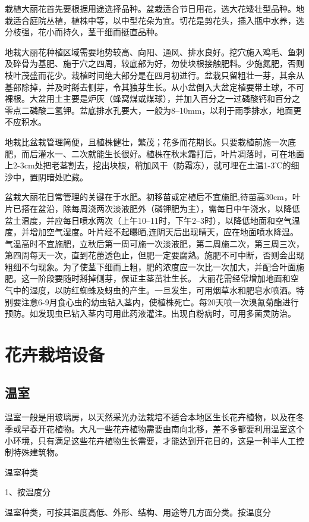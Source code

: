 \documentclass{ctexbook}
\begin{document}
栽植大丽花首先要根据用途选择品种。盆栽适合节日用花，选大花矮壮型品种。地栽适合庭院丛植，植株中等，以中型花朵为宜。切花是剪花头，插入瓶中水养，选分枝强，花小而持久，茎干细而挺直品种。
	
地栽大丽花种植区域需要地势较高、向阳、通风、排水良好。挖穴施入鸡毛、鱼刺及碎骨为基肥、施于穴之四周，较底部为好，勿使块根接触肥料。少施氮肥，否则枝叶茂盛而花少。栽植时间绝大部分是在四月初进行。盆栽只留粗壮一芽，其余从基部除掉，并及时掰去侧芽，令其独芽生长。从小盆倒入大盆定植要带土球，不可裸根。大盆用土主要是炉灰（蜂窝煤或煤球），并加入百分之一过磷酸钙和百分之零点二磷酸二氢钾。盆底排水孔要大，一般为8--10mm，以利于雨季排水，地面更不应积水。

地栽比盆栽管理简便，且植株健壮，繁茂；花多而花期长。只要栽植前施一次底肥，而后灌水一、二次就能生长很好。植株在秋末霜打后，叶片凋落时，可在地面上2-3cm处把老茎割去，挖出块根，稍加风干（防霜冻），就可埋在土温1-3℃的细沙中，置阴暗处贮藏。

盆栽大丽花日常管理的关键在于水肥。初移苗或定植后不宜施肥,待苗高30cm，叶片已搭在盆沿，除每周浇两次淡液肥外（磷钾肥为主），需每日中午浇水，以降低盆土温度，并应每日喷水两次（上午10--11时，下午2--3时），以降低地面和空气温度，并增加空气湿度。叶片经不起曝晒,连阴天后出现晴天，应在地面喷水降温。气温高时不宜施肥，立秋后第一周可施一次淡液肥，第二周施二次，第三周三次，第四周每天一次，直到花蕾透色止，但肥一定要腐熟。施肥不可中断，否则会出现粗细不匀现象。为了使茎下细而上粗，肥的浓度应一次比一次加大，并配合叶面施肥。这一阶段要随时掰掉侧芽，保证主茎茁壮生长。
大丽花需经常增加地面和空气中的湿度，以防红蜘蛛及蚜虫的产生。一旦发生，可用烟草水和肥皂水喷洒。特别要注意6-9月食心虫的幼虫钻入茎内，使植株死亡。每20天喷一次溴氰菊酯进行预防。如发现虫已钻入茎内可用此药液灌注。出现白粉病时，可用多菌灵防治。

\section{花卉栽培设备}
\subsection{温室}
温室一般是用玻璃房，以天然采光办法栽培不适合本地区生长花卉植物，以及在冬季或早春开花植物。大凡一些花卉植物需要由南向北移，差不多都要利用温室这个小环境，只有满足这些花卉植物生长需要，才能达到开花目的，这是一种半人工控制特殊建筑物。

温室种类

1、按温度分

温室种类，可按其温度高低、外形、结构、用途等几方面分类。按温度分
\end{document}
